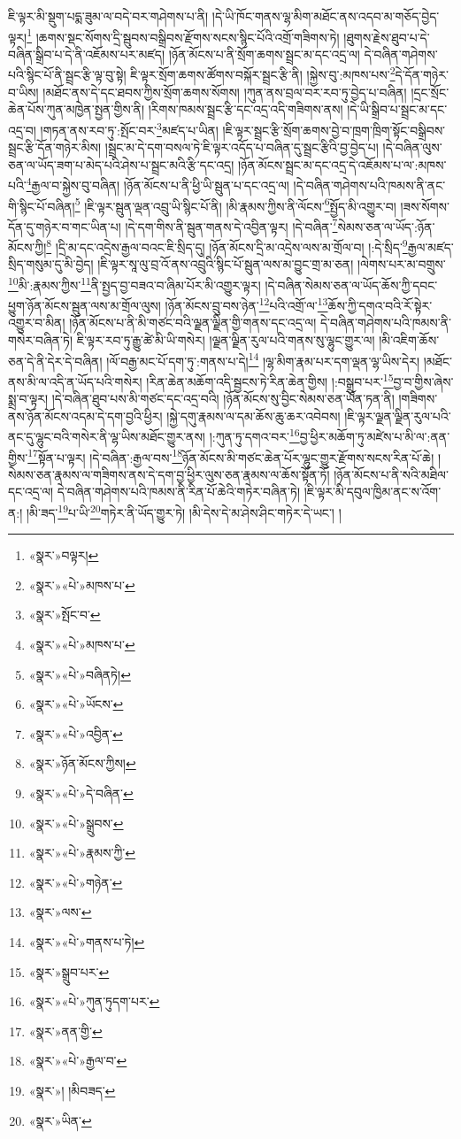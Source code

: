 ཇི་ལྟར་མི་སྡུག་པདྨ་ཟུམ་ལ་བདེ་བར་གཤེགས་པ་ནི། །དེ་ཡི་ཁོང་གནས་ལྷ་མིག་མཐོང་ནས་འདབ་མ་གཅོད་བྱེད་ལྟར།\footnote{«སྣར་»བལྟར།} །ཆགས་སྡང་སོགས་དྲི་སྦུབས་བསྒྲིབས་རྫོགས་སངས་སྙིང་པོའི་འགྲོ་གཟིགས་ཏེ། །ཐུགས་རྗེས་ཐུབ་པ་དེ་བཞིན་སྒྲིབ་པ་དེ་ནི་འཇོམས་པར་མཛད། །ཉོན་མོངས་པ་ནི་སྲོག་ཆགས་སྦྲང་མ་དང་འདྲ་ལ། དེ་བཞིན་གཤེགས་པའི་སྙིང་པོ་ནི་སྦྲང་རྩི་ལྟ་བུ་སྟེ། ཇི་ལྟར་སྲོག་ཆགས་ཚོགས་བསྐོར་སྦྲང་རྩི་ནི། །སྐྱེས་བུ་:མཁས་པས་\footnote{«སྣར་»«པེ་»མཁས་པ་}དེ་དོན་གཉེར་བ་ཡིས། །མཐོང་ནས་དེ་དང་ཐབས་ཀྱིས་སྲོག་ཆགས་སོགས། །ཀུན་ནས་བྲལ་བར་རབ་ཏུ་བྱེད་པ་བཞིན། །དྲང་སྲོང་ཆེན་པོས་ཀུན་མཁྱེན་སྤྱན་གྱིས་ནི། །རིགས་ཁམས་སྦྲང་རྩི་དང་འདྲ་འདི་གཟིགས་ནས། །དེ་ཡི་སྒྲིབ་པ་སྦྲང་མ་དང་འདྲ་བ། །གཏན་ནས་རབ་ཏུ་:སྤོང་བར་\footnote{«སྣར་»སྤོང་བ་}མཛད་པ་ཡིན། །ཇི་ལྟར་སྦྲང་རྩི་སྲོག་ཆགས་བྱེ་བ་ཁྲག་ཁྲིག་སྟོང་བསྒྲིབས་སྦྲང་རྩི་དོན་གཉེར་མིས། །སྦྲང་མ་དེ་དག་བསལ་ཏེ་ཇི་ལྟར་འདོད་པ་བཞིན་དུ་སྦྲང་རྩིའི་བྱ་བྱེད་པ། །དེ་བཞིན་ལུས་ཅན་ལ་ཡོད་ཟག་པ་མེད་པའི་ཤེས་པ་སྦྲང་མའི་རྩི་དང་འདྲ། །ཉོན་མོངས་སྦྲང་མ་དང་འདྲ་དེ་འཇོམས་པ་ལ་:མཁས་པའི་\footnote{«སྣར་»«པེ་»མཁས་པ་}རྒྱལ་བ་སྐྱེས་བུ་བཞིན། །ཉོན་མོངས་པ་ནི་ཕྱི་ཡི་སྦུན་པ་དང་འདྲ་ལ། །དེ་བཞིན་གཤེགས་པའི་ཁམས་ནི་ནང་གི་སྙིང་པོ་བཞིན།\footnote{«སྣར་»«པེ་»བཞིནཏེ།} །ཇི་ལྟར་སྦུན་ལྡན་འབྲུ་ཡི་སྙིང་པོ་ནི། །མི་རྣམས་ཀྱིས་ནི་ལོངས་\footnote{«སྣར་»«པེ་»ཡོངས་}སྤྱོད་མི་འགྱུར་བ། །ཟས་སོགས་དོན་དུ་གཉེར་བ་གང་ཡིན་པ། །དེ་དག་གིས་ནི་སྦུན་གནས་དེ་འབྱིན་ལྟར། །དེ་བཞིན་\footnote{«སྣར་»«པེ་»འབྱིན་}སེམས་ཅན་ལ་ཡོད་:ཉོན་མོངས་ཀྱི།\footnote{«སྣར་»ཉོན་མོངས་ཀྱིས།} །དྲི་མ་དང་འདྲེས་རྒྱལ་བའང་ཇི་སྲིད་དུ། །ཉོན་མོངས་དྲི་མ་འདྲེས་ལས་མ་གྲོལ་བ། །:དེ་སྲིད་\footnote{«སྣར་»«པེ་»དེ་བཞིན་}རྒྱལ་མཛད་སྲིད་གསུམ་དུ་མི་བྱེད། །ཇི་ལྟར་སཱ་ལུ་བྲ་འོ་ནས་འབྲུའི་སྙིང་པོ་སྦུན་ལས་མ་བྱུང་གྲ་མ་ཅན། །ལེགས་པར་མ་བགྲུས་\footnote{«སྣར་»«པེ་»སྒྲུབས་}མི་:རྣམས་ཀྱིས་\footnote{«སྣར་»«པེ་»རྣམས་ཀྱི་}ནི་སྤྱད་བྱ་བཟའ་བ་ཞིམ་པོར་མི་འགྱུར་ལྟར། །དེ་བཞིན་སེམས་ཅན་ལ་ཡོད་ཆོས་ཀྱི་དབང་ཕྱུག་ཉོན་མོངས་སྦུན་ལས་མ་གྲོལ་ལུས། །ཉོན་མོངས་བྲུ་བས་ཉེན་\footnote{«སྣར་»«པེ་»གཉེན་}པའི་འགྲོ་ལ་\footnote{«སྣར་»ལས་}ཆོས་ཀྱི་དགའ་བའི་རོ་སྟེར་འགྱུར་བ་མིན། །ཉོན་མོངས་པ་ནི་མི་གཙང་བའི་ལྗན་ལྗིན་གྱི་གནས་དང་འདྲ་ལ། དེ་བཞིན་གཤེགས་པའི་ཁམས་ནི་གསེར་བཞིན་ཏེ། ཇི་ལྟར་རབ་ཏུ་རྒྱུ་ཚེ་མི་ཡི་གསེར། །ལྗན་ལྗིན་རུལ་པའི་གནས་སུ་ལྷུང་གྱུར་ལ། །མི་འཇིག་ཆོས་ཅན་དེ་ནི་དེར་དེ་བཞིན། །ལོ་བརྒྱ་མང་པོ་དག་ཏུ་:གནས་པ་དེ།\footnote{«སྣར་»«པེ་»གནས་པ་ཏེ།} །ལྷ་མིག་རྣམ་པར་དག་ལྡན་ལྷ་ཡིས་དེར། །མཐོང་ནས་མི་ལ་འདི་ན་ཡོད་པའི་གསེར། །རིན་ཆེན་མཆོག་འདི་སྦྱངས་ཏེ་རིན་ཆེན་གྱིས། །:བསྒྲུབ་པར་\footnote{«སྣར་»སྒྲུབ་པར་}བྱ་བ་གྱིས་ཞེས་སྨྲ་བ་ལྟར། །དེ་བཞིན་ཐུབ་པས་མི་གཙང་དང་འདྲ་བའི། །ཉོན་མོངས་སུ་བྱིང་སེམས་ཅན་ཡོན་ཏན་ནི། །གཟིགས་ནས་ཉོན་མོངས་འདམ་དེ་དག་བྱའི་ཕྱིར། །སྐྱེ་དགུ་རྣམས་ལ་དམ་ཆོས་ཆུ་ཆར་འབེབས། །ཇི་ལྟར་ལྗན་ལྗིན་རུལ་པའི་ནང་དུ་ལྷུང་བའི་གསེར་ནི་ལྷ་ཡིས་མཐོང་གྱུར་ནས། །:ཀུན་ཏུ་དགའ་བར་\footnote{«སྣར་»«པེ་»ཀུན་ཏུདག་པར་}བྱ་ཕྱིར་མཆོག་ཏུ་མཛེས་པ་མི་ལ་:ནན་གྱིས་\footnote{«སྣར་»ནན་གྱི་}སྟོན་པ་ལྟར། །དེ་བཞིན་:རྒྱལ་བས་\footnote{«སྣར་»«པེ་»རྒྱལ་བ་}ཉོན་མོངས་མི་གཙང་ཆེན་པོར་ལྷུང་གྱུར་རྫོགས་སངས་རིན་པོ་ཆེ། །སེམས་ཅན་རྣམས་ལ་གཟིགས་ནས་དེ་དག་བྱ་ཕྱིར་ལུས་ཅན་རྣམས་ལ་ཆོས་སྟོན་ཏོ། །ཉོན་མོངས་པ་ནི་སའི་མཐིལ་དང་འདྲ་ལ། དེ་བཞིན་གཤེགས་པའི་ཁམས་ནི་རིན་པོ་ཆེའི་གཏེར་བཞིན་ཏེ། །ཇི་ལྟར་མི་དབུལ་ཁྱིམ་ནང་ས་འོག་ན:། །མི་ཟད་\footnote{«སྣར་»། །མིབཟད་}པ་ཡི་\footnote{«སྣར་»ཡིན་}གཏེར་ནི་ཡོད་གྱུར་ཏེ། །མི་དེས་དེ་མ་ཤེས་ཤིང་གཏེར་དེ་ཡང་། །
